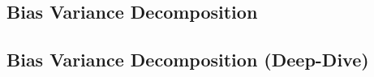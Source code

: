 %

%


\subsection{Bias Variance Decomposition}


\subsection{Bias Variance Decomposition (Deep-Dive)}

